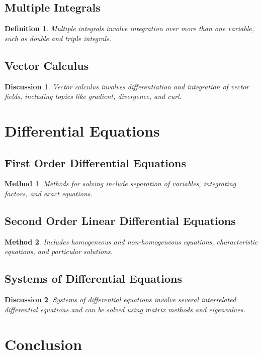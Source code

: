 \documentclass[a4paper,12pt]{book}
\newtheorem{definition}{Definition}
\newtheorem{method}{Method}
\newtheorem{discussion}{Discussion}
\begin{document}
\subsection{Multiple Integrals}
\begin{definition}
Multiple integrals involve integration over more than one variable, such as double and triple integrals.
\end{definition}

\subsection{Vector Calculus}
\begin{discussion}
Vector calculus involves differentiation and integration of vector fields, including topics like gradient, divergence, and curl.
\end{discussion}

\section{Differential Equations}
\subsection{First Order Differential Equations}
\begin{method}
Methods for solving include separation of variables, integrating factors, and exact equations.
\end{method}

\subsection{Second Order Linear Differential Equations}
\begin{method}
Includes homogeneous and non-homogeneous equations, characteristic equations, and particular solutions.
\end{method}

\subsection{Systems of Differential Equations}
\begin{discussion}
Systems of differential equations involve several interrelated differential equations and can be solved using matrix methods and eigenvalues.
\end{discussion}

\section{Conclusion}
\end{document}
